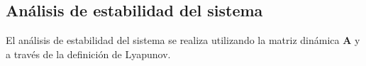 
\subsection{Análisis de estabilidad del sistema}

El análisis de estabilidad del sistema se realiza utilizando la matriz
dinámica $\mathbf{A}$ y a través de la definición de Lyapunov.



